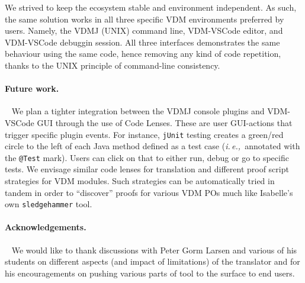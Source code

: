 \documentclass[runningheads,a4paper]{llncs}
\newcommand{\ie}{{\em i.\,e.,\/}}
\begin{document}
We strived to keep the ecosystem stable and environment independent. As such, the same solution works in all three specific VDM environments preferred by users. Namely, the VDMJ (UNIX) command line, VDM-VSCode editor, and VDM-VSCode debuggin session. All three interfaces demonstrates the same behaviour using the same code, hence removing any kind of code repetition, thanks to the UNIX principle of command-line consistency. 

\paragraph*{Future work.}~
%
We plan a tighter integration between the VDMJ console plugins and VDM-VSCode GUI through the use of Code Lenses. These are user GUI-actions that trigger specific plugin events. For instance, \texttt{jUnit} testing creates a green/red circle to the left of each Java method defined as a test case (\ie~annotated with the \texttt{@Test} mark). Users can click on that to either run, debug or go to specific tests. We envisage similar code lenses for translation and different proof script strategies for VDM modules. Such strategies can be automatically tried in tandem in order to ``discover'' proofs for various VDM POs much like Isabelle's own \texttt{sledgehammer} tool.      

\paragraph*{Acknowledgements.}~
%
We would like to thank discussions with Peter Gorm Larsen and various of his students on different aspects (and impact of limitations) of the translator and for his encouragements on pushing various parts of tool to the surface to end users.


%


\end{document}
